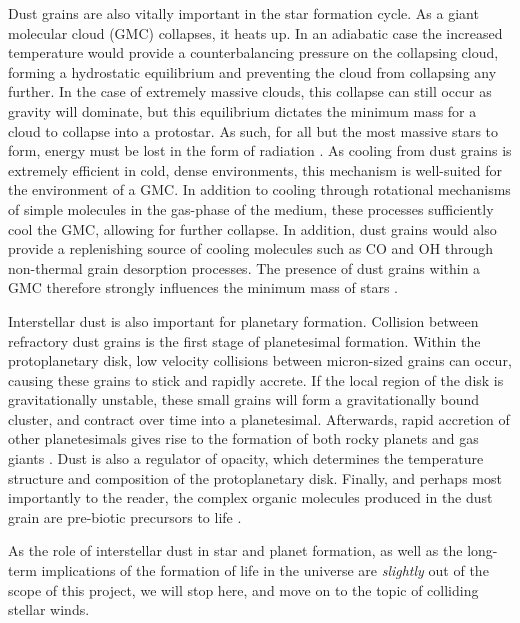 Dust grains are also vitally important in the star formation cycle.
As a giant molecular cloud (GMC) collapses, it heats up.
In an adiabatic case the increased temperature would provide a counterbalancing pressure on the collapsing cloud, forming a hydrostatic equilibrium and preventing the cloud from collapsing any further.
In the case of extremely massive clouds, this collapse can still occur as gravity will dominate, but this equilibrium dictates the minimum mass for a cloud to collapse into a protostar.
As such, for all but the most massive stars to form, energy must be lost in the form of radiation
\parencite{ward-thompsonIntroductionStarFormation2011}.
As cooling from dust grains is extremely efficient in cold, dense environments, this mechanism is well-suited for the environment of a GMC.
In addition to cooling through rotational mechanisms of simple molecules in the gas-phase of the medium, these processes sufficiently cool the GMC, allowing for further collapse.
In addition, dust grains would also provide a replenishing source of cooling molecules such as CO and OH through non-thermal grain desorption processes.
The presence of dust grains within a GMC therefore strongly influences the minimum mass of stars
\parencite{williamsChemistryCosmicDust2015}.

Interstellar dust is also important for planetary formation.
Collision between refractory dust grains is the first stage of planetesimal formation.
Within the protoplanetary disk, low velocity collisions between micron-sized grains can occur, causing these grains to stick and rapidly accrete.
If the local region of the disk is gravitationally unstable, these small grains will form a gravitationally bound cluster, and contract over time into a planetesimal.
Afterwards, rapid accretion of other planetesimals gives rise to the formation of both rocky planets and gas giants
\parencite{apaiProtoplanetaryDustAstrophysical2010}.
Dust is also a regulator of opacity, which determines the temperature structure and composition of the protoplanetary disk.
Finally, and perhaps most importantly to the reader, the complex organic molecules produced in the dust grain are pre-biotic precursors to life
\parencite{birnstielDustEvolutionFormation2016}.

As the role of interstellar dust in star and planet formation, as well as the long-term implications of the formation of life in the universe are \textit{slightly} out of the scope of this project, we will stop here, and move on to the topic of colliding stellar winds.

